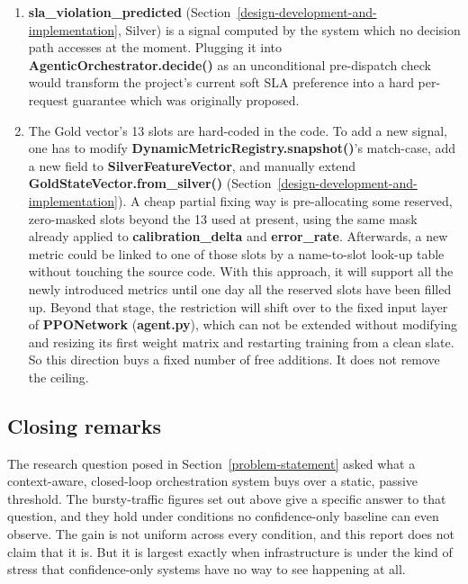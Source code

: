 \begin{enumerate}
\item \textbf{sla\_violation\_predicted}
(Section~\ref{design-development-and-implementation}, Silver) is a
signal computed by the system which no decision path accesses at the
moment. Plugging it into \textbf{AgenticOrchestrator.decide()} as an
unconditional pre-dispatch check would transform the project's
current soft SLA preference into a hard per-request guarantee which
was originally proposed.

\item The Gold vector's 13 slots are hard-coded in the code. To add
a new signal, one has to modify \textbf{DynamicMetricRegistry.snapshot()}'s
match-case, add a new field to \textbf{SilverFeatureVector}, and
manually extend \textbf{GoldStateVector.from\_silver()}
(Section~\ref{design-development-and-implementation}). A cheap
partial fixing way is pre-allocating some reserved, zero-masked slots
beyond the 13 used at present, using the same mask already applied to
\textbf{calibration\_delta} and \textbf{error\_rate}. Afterwards, a
new metric could be linked to one of those slots by a name-to-slot
look-up table without touching the source code. With this approach,
it will support all the newly introduced metrics until one day all
the reserved slots have been filled up. Beyond that stage, the
restriction will shift over to the fixed input layer of
\textbf{PPONetwork} (\textbf{agent.py}), which can not be extended
without modifying and resizing its first weight matrix and
restarting training from a clean slate. So this direction
buys a fixed number of free additions. It does not remove the ceiling.
\end{enumerate}

\hypertarget{closing-remarks}{%
\subsection{Closing remarks}\label{closing-remarks}}

The research question posed in Section~\ref{problem-statement} asked what a
context-aware, closed-loop orchestration system buys over a static,
passive threshold. The bursty-traffic figures set out above give a
specific answer to that question, and they hold under conditions no
confidence-only baseline can even observe. The gain is not uniform
across every condition, and this report does not claim that it is. But
it is largest exactly when infrastructure is under the kind of stress
that confidence-only systems have no way to see happening at all.